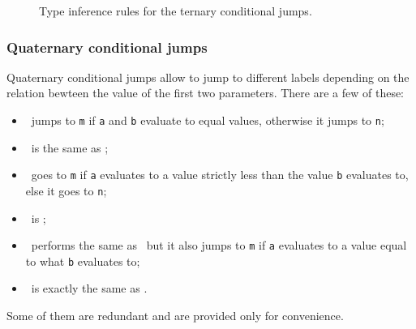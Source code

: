 \begin{figure}[H]
	\centering


	\caption{Type inference rules for the ternary conditional jumps.}
	\label{fig:nstar-instructionset-terminal-cjX-triadic-typerules}
\end{figure}

\subsubsection{Quaternary conditional jumps}\label{subsubsec:nstar-instructionset-terminal-cjX-tetradic}

Quaternary conditional jumps allow to jump to different labels depending on the relation bewteen the value of the first two parameters.
There are a few of these:
\begin{itemize}
	\item {}\ jumps to \texttt{m} if \texttt{a} and \texttt{b} evaluate to equal values, otherwise it jumps to \texttt{n};
	\item {}\ is the same as ;
	\item {}\ goes to \texttt{m} if \texttt{a} evaluates to a value strictly less than the value \texttt{b} evaluates to, else it goes to \texttt{n};
	\item {}\ is ;
	\item {}\ performs the same as \ but it also jumps to \texttt{m} if \texttt{a} evaluates to a value equal to what \texttt{b} evaluates to;
	\item {}\ is exactly the same as .
\end{itemize}
Some of them are redundant and are provided only for convenience.

